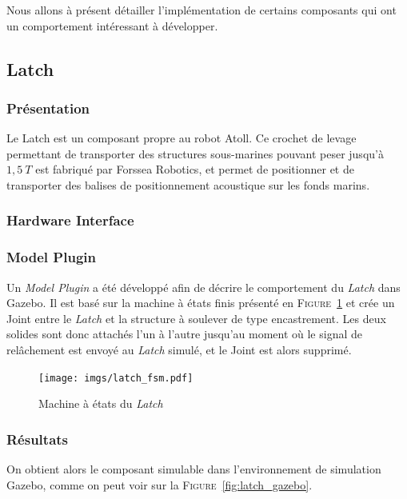 		Nous allons à présent détailler l'implémentation de certains composants qui ont un comportement intéressant à développer.

		\subsection{Latch}

			\subsubsection{Présentation}

				Le Latch est un composant propre au robot \gls{Atoll}. Ce crochet de levage permettant de transporter des structures sous-marines pouvant peser jusqu'à $1,5\ T$ est fabriqué par Forssea Robotics, et permet de positionner et de transporter des balises de positionnement acoustique sur les fonds marins.

			\subsubsection{Hardware Interface}


				
			\subsubsection{Model Plugin}
			
				Un \textit{Model Plugin} a été développé afin de décrire le comportement du \textit{Latch} dans \gls{Gazebo}. Il est basé sur la machine à états finis présenté en \textsc{Figure}~\ref{fig:latch_fsm} et crée un \gls{Joint} entre le \textit{Latch} et la structure à soulever de type encastrement. Les deux solides sont donc attachés l'un à l'autre jusqu'au moment où le signal de relâchement est envoyé au \textit{Latch} simulé, et le \gls{Joint} est alors supprimé.

				\begin{figure}[!htb]
					\centering
					\texttt{[image: imgs/latch\_fsm.pdf]}
					\caption{Machine à états du \textit{Latch}}
					\label{fig:latch_fsm}
				\end{figure}

			\subsubsection{Résultats}

				On obtient alors le composant simulable dans l'environnement de simulation \gls{Gazebo}, comme on peut voir sur la \textsc{Figure}~\ref{fig:latch_gazebo}.

